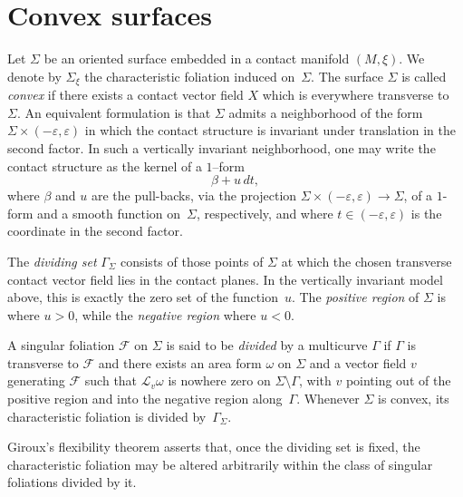 \documentclass{amsart}
\numberwithin{equation}{section}
\numberwithin{figure}{section}
\theoremstyle{definition}
\theoremstyle{remark}
\let\oldSigma\Sigma
\renewcommand{\Sigma}{\oldSigma}
\let\olddxi\xi %
\renewcommand{\xi}{\olddxi}
\newcommand{\X}{X}
\let\oldgamma\Gamma %
\renewcommand{\Gamma}{\oldgamma}
\begin{document}
\section{Convex surfaces}\label{sec:convex}

Let $\Sigma$ be an oriented surface embedded in a contact manifold $(M,\xi)$. We denote by $\Sigma_\xi$ the characteristic foliation induced on~$\Sigma$. The surface $\Sigma$ is called \emph{convex} if there exists a contact vector field $\X$ which is everywhere transverse to~$\Sigma$. An equivalent formulation is that $\Sigma$ admits a neighborhood of the form $\Sigma\times(-\varepsilon,\varepsilon)$ in which the contact structure is invariant under translation in the second factor. In such a vertically invariant neighborhood, one may write the contact structure as the kernel of a $1$--form
\[
\beta+u\,dt,
\]
where $\beta$ and $u$ are the pull-backs, via the projection $\Sigma\times(-\varepsilon,\varepsilon)\to\Sigma$, of a $1$-form and a smooth function on~$\Sigma$, respectively, and where $t\in(-\varepsilon,\varepsilon)$ is the coordinate in the second factor.

The \emph{dividing set} $\Gamma_\Sigma$ consists of those points of $\Sigma$ at which the chosen transverse contact vector field lies in the contact planes. In the vertically invariant model above, this is exactly the zero set of the function~$u$. The \emph{positive region} of $\Sigma$ is where $u>0$, while the \emph{negative region} where $u<0$.

A singular foliation $\mathcal F$ on $\Sigma$ is said to be \emph{divided} by a multicurve $\Gamma$ if $\Gamma$ is transverse to $\mathcal F$ and there exists an area form $\omega$ on $\Sigma$ and a vector field $v$ generating $\mathcal F$ such that $\mathcal L_v\omega$ is nowhere zero on $\Sigma\setminus\Gamma$, with $v$ pointing out of the positive region and into the negative region along~$\Gamma$. Whenever $\Sigma$ is convex, its characteristic foliation is divided by~$\Gamma_\Sigma$.

Giroux's flexibility theorem asserts that, once the dividing set is fixed, the characteristic foliation may be altered arbitrarily within the class of singular foliations divided by it.
\end{document}
